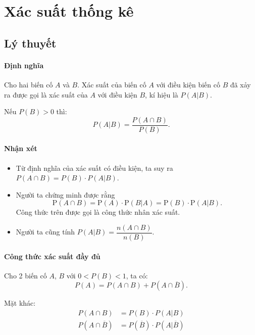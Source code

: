 \documentclass[twoside,final]{hcmut-report}
\begin{document}
\coverpage\clearpage
\tableofcontents
\clearpage

\fancyfoot{}

\setcounter{page}{1}
\section{Xác suất thống kê}
\subsection{Lý thuyết}
\paragraph*{Định nghĩa}
Cho hai biến cố $A$ và $B$. Xác suất của biến cố $A$ với điều kiện biến cố $B$ đã xảy ra được gọi là xác suất của $A$ với điều kiện $B$, kí hiệu là $P(A | B)$.

Nếu $P(B) > 0$ thì:
\[
    P(A | B) = \frac{P(A \cap B)}{P(B)}.
\]
\paragraph*{Nhận xét}
\begin{itemize}[itemsep=0pt, topsep=0pt, parsep=0pt,label=-]
    \item Từ định nghĩa của xác suất có điều kiện, ta suy ra $P(A \cap B) = P(B) \cdot P(A | B)$.
    \item Người ta chứng minh được rằng
          \[
              \mathrm{P}(A \cap B) = \mathrm{P}(A) \cdot \mathrm{P}(B | A) = \mathrm{P}(B) \cdot \mathrm{P}(A | B).
          \]
          Công thức trên được gọi là công thức nhân xác suất.
    \item Người ta cũng tính $P(A | B) = \dfrac{n(A \cap B)}{n(B)}$.
\end{itemize}
\paragraph*{Công thức xác suất đầy đủ}
Cho 2 biến cố $A$, $B$ với $0 < P(B) < 1$, ta có:
\[
    P(A) = P(A \cap B) + P(A \cap \overline{B}).
\]

Mặt khác:
\begin{align*}
    P(A \cap B)            & = P(B) \cdot P(A | B)                       \\
    P(A \cap \overline{B}) & = P(\overline{B}) \cdot P(A | \overline{B})
\end{align*}
\end{document}
